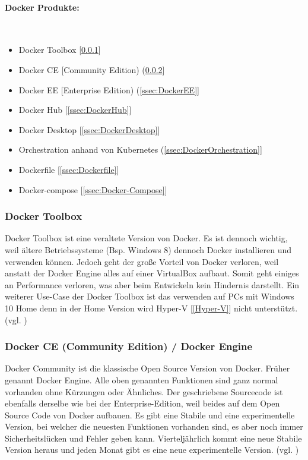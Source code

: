 \paragraph{Docker Produkte:}\mbox{}\\
\begin{itemize}
    \item Docker Toolbox [\ref{ssec:DockerToolbox}]
    \item Docker CE [Community Edition) (\ref{ssec:DockerCE}]
    \item Docker EE [Enterprise Edition) (\ref{ssec:DockerEE}]
    \item Docker Hub [\ref{ssec:DockerHub}]
    \item Docker Desktop [\ref{ssec:DockerDesktop}]
    \item Orchestration anhand von Kubernetes (\ref{ssec:DockerOrchestration}]
    \item Dockerfile [\ref{ssec:Dockerfile}]
    \item Docker-compose [\ref{ssec:Docker-Compose}]
\end{itemize}
\subsubsection{Docker Toolbox} \label{ssec:DockerToolbox}
Docker Toolbox ist eine veraltete Version von Docker. Es ist dennoch wichtig, weil ältere Betriebssysteme (Bsp. Windows 8) dennoch Docker installieren und verwenden können. Jedoch geht der große Vorteil von Docker verloren, weil anstatt der Docker Engine alles auf einer VirtualBox aufbaut. Somit geht einiges an Performance verloren, was aber beim Entwickeln kein Hindernis darstellt. Ein weiterer Use-Case der Docker Toolbox ist das verwenden auf PCs mit Windows 10 Home denn in der Home Version wird Hyper-V [\ref{Hyper-V}] nicht unterstützt. (vgl. \cite{DockerToolbox})
\subsubsection{Docker CE (Community Edition) / Docker Engine}\label{ssec:DockerCE}
Docker Community ist die klassische Open Source Version von Docker. Früher genannt Docker Engine. Alle oben genannten Funktionen sind ganz normal vorhanden ohne Kürzungen oder Ähnliches. Der geschriebene Sourcecode ist ebenfalls derselbe wie bei der Enterprise-Edition, weil beides auf dem Open Source Code von Docker aufbauen. Es gibt eine Stabile und eine experimentelle Version, bei welcher die neuesten Funktionen vorhanden sind, es aber noch immer Sicherheitslücken und Fehler geben kann. Vierteljährlich kommt eine neue Stabile Version heraus und jeden Monat gibt es eine neue experimentelle Version. (vgl. \cite{DockerCE})
